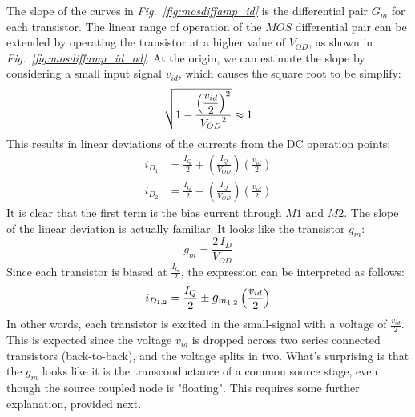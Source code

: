 The slope of the curves in \emph{Fig.~\ref{fig:mosdiffamp_id}} is the differential pair $G_m$ for each transistor.   The linear range of operation of the $MOS$ differential pair can be extended by operating the transistor at a higher value of $V_{OD}$, as shown in \emph{Fig.~\ref{fig:mosdiffamp_id_od}}.  At the origin, we can estimate the slope by considering a small input signal $v_{id}$, which causes the square root to be simplify:
    \begin{equation} 
        \sqrt{1 - \frac{{\mathlarger{\left(\frac{v_{id}}{2}\right)}}^2}{{V_{OD}}^2}} \approx 1
    \end{equation}
This results in linear deviations of the currents from the DC operation points:
    \begin{align} 
        i_{D_1} &= \frac{I_Q}{2} + \left(\frac{I_Q}{V_{OD}}\right) \left(\frac{v_{id}}{2}\right)\\
        i_{D_2} &= \frac{I_Q}{2} - \left(\frac{I_Q}{V_{OD}}\right) \left(\frac{v_{id}}{2}\right)
    \end{align}
It is clear that the first term is the bias current through $M1$ and $M2$.  The slope of the linear deviation is actually familiar.  It looks like the transistor $g_m$:
    \begin{equation}
        g_m = \frac{2\,I_D}{V_{OD}}
    \end{equation}
Since each transistor is biased at $\frac{I_Q}{2}$, the expression can be interpreted as follows:
    \begin{equation} 
        i_{D_{1,2}} = \frac{I_Q}{2} \pm \mathlarger{g_{m_{1,2}}} \left(\frac{v_{id}}{2}\right)
    \end{equation}
In other words, each transistor is excited in the small-signal with a voltage of $\frac{v_{id}}{2}$.  This is expected since the voltage $v_{id}$ is dropped across two series connected transistors (back-to-back), and the voltage splits in two.  What's surprising is that the $g_m$ looks like it is the transconductance of a common source stage, even though the source coupled node is "floating".  This requires some further explanation, provided next.
